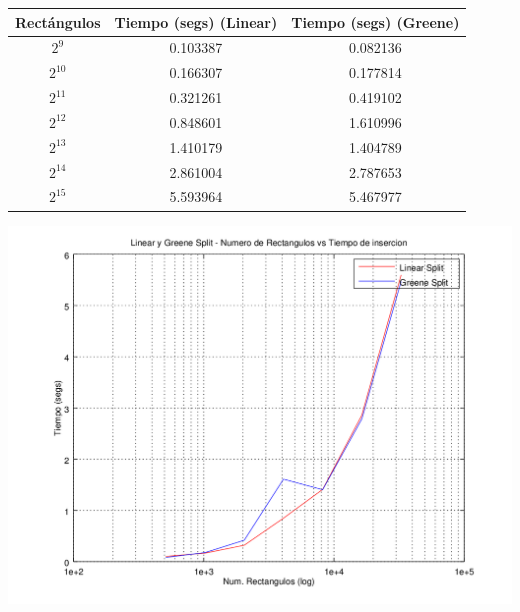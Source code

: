 \documentclass[letterpaper,10pt]{article}
\begin{document}
	\begin{center}

		\begin{tabular}{|c|c||c|}
			\hline
			Rectángulos	& Tiempo (segs) (Linear) & Tiempo (segs) (Greene) \\
			\hline
			$2^{9}$ 	& 0.103387	& 0.082136\\
			\hline
			$2^{10}$ 	& 0.166307	& 0.177814\\
			\hline
			$2^{11}$ 	& 0.321261	& 0.419102\\
			\hline
			$2^{12}$ 	& 0.848601	& 1.610996\\
			\hline
			$2^{13}$ 	& 1.410179	& 1.404789\\
			\hline
			$2^{14}$ 	& 2.861004	& 2.787653\\
			\hline
			$2^{15}$ 	& 5.593964	& 5.467977\\
			\hline
		\end{tabular}

		\includegraphics[width=0.75\textheight]{fig1.png}
	\end{center}

	\newpage
\end{document}

